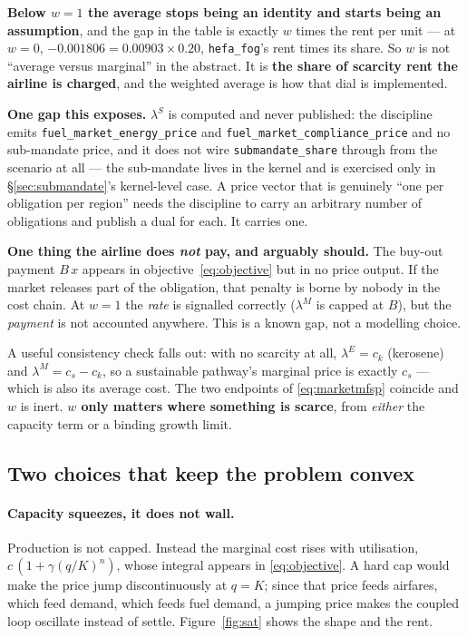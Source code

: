 \documentclass[11pt,a4paper]{article}
\newcommand{\var}[1]{\texttt{\small #1}}
\begin{document}
\begin{keybox}
\medskip
\textbf{Below $w = 1$ the average stops being an identity and starts being an assumption},
and the gap in the table is exactly $w$ times the rent per unit --- at $w=0$,
$-0.001806 = 0.00903 \times 0.20$, \var{hefa\_fog}'s rent times its share. So $w$ is not
``average versus marginal'' in the abstract. It is \textbf{the share of scarcity rent the
airline is charged}, and the weighted average is how that dial is implemented.

\medskip
\textbf{One gap this exposes.} $\lambda^{S}$ is computed and never published: the
discipline emits \var{fuel\_market\_energy\_price} and
\var{fuel\_market\_compliance\_price} and no sub-mandate price, and it does not wire
\var{submandate\_share} through from the scenario at all --- the sub-mandate lives in the
kernel and is exercised only in \S\ref{sec:submandate}'s kernel-level case. A price vector
that is genuinely ``one per obligation per region'' needs the discipline to carry an
arbitrary number of obligations and publish a dual for each. It carries one.
\end{keybox}

\begin{keybox}
\textbf{One thing the airline does \emph{not} pay, and arguably should.} The buy-out
payment $B\,x$ appears in objective~\eqref{eq:objective} but in no price output. If the
market releases part of the obligation, that penalty is borne by nobody in the cost
chain. At $w=1$ the \emph{rate} is signalled correctly ($\lambda^{M}$ is capped at $B$),
but the \emph{payment} is not accounted anywhere. This is a known gap, not a modelling
choice.
\end{keybox}

A useful consistency check falls out: with no scarcity at all, $\lambda^{E} = c_{k}$
(kerosene) and $\lambda^{M} = c_{s} - c_{k}$, so a sustainable pathway's marginal price
is exactly $c_{s}$ --- which is also its average cost. The two endpoints of
\eqref{eq:marketmfsp} coincide and $w$ is inert. \textbf{$w$ only matters where something
is scarce}, from \emph{either} the capacity term or a binding growth limit.

\subsection{Two choices that keep the problem convex}
\label{sec:convexity}

\paragraph{Capacity squeezes, it does not wall.} Production is not capped. Instead the
marginal cost rises with utilisation, $c\,(1+\gamma(q/K)^{n})$, whose integral appears in
\eqref{eq:objective}. A hard cap would make the price jump discontinuously at $q=K$; since
that price feeds airfares, which feed demand, which feeds fuel demand, a jumping price
makes the coupled loop oscillate instead of settle. Figure~\ref{fig:sat} shows the shape
and the rent.
\end{document}

